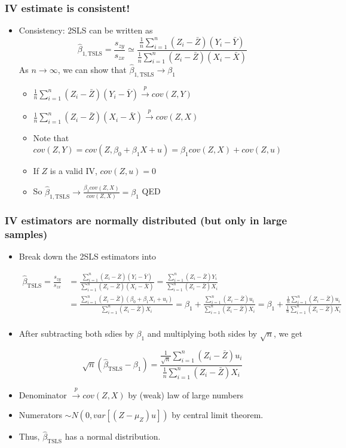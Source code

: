 \documentclass[aspectratio=169]{beamer}
\begin{document}
\begin{frame}
\frametitle{IV estimate is consistent!}
\begin{itemize}
\item Consistency: 2SLS can be written as
\[
\hat{\beta}_{1,\text{TSLS}}=\frac{s_{zy}}{s_{zx}}\simeq\frac{\frac{1}{n}\sum_{i=1}^n(Z_i-\bar{Z})(Y_i-\bar{Y})}{\frac{1}{n}\sum_{i=1}^n(Z_i-\bar{Z})(X_i-\bar{X})}
\]
As $n\to\infty$, we can show that $\hat{\beta}_{1,\text{TSLS}}\to\beta_1$
\begin{itemize}
\item $\frac{1}{n}\sum_{i=1}^n(Z_i-\bar{Z})(Y_i-\bar{Y}) \xrightarrow{p} cov(Z,Y)$
\item $\frac{1}{n}\sum_{i=1}^n(Z_i-\bar{Z})(X_i-\bar{X}) \xrightarrow{p} cov(Z,X)$
\item Note that $cov(Z,Y) = cov(Z,\beta_0+\beta_1X+u)=\beta_1 cov(Z,X) + cov(Z,u)$
\item If $Z$ is a valid IV, $ cov(Z,u)=0$
\item So $\hat{\beta}_{1,\text{TSLS}}\to\frac{\beta_1 cov(Z,X)}{cov(Z,X)} =\beta_1$ QED
\end{itemize}
\end{itemize}
\end{frame}

\begin{frame}
\frametitle{IV estimators are normally distributed (but only in large samples)}
\begin{itemize}
\item Break down the 2SLS estimators into
\begin{scriptsize}
\[
\begin{aligned}
\hat{\beta}_{\text{TSLS}}=\frac{s_{zy}}{s_{zx}}&=\frac{\sum_{i=1}^n(Z_i-\bar{Z})(Y_i-\bar{Y})}{\sum_{i=1}^n(Z_i-\bar{Z})(X_i-\bar{X})}= \frac{\sum_{i=1}^n(Z_i-\bar{Z})Y_i}{\sum_{i=1}^n(Z_i-\bar{Z})X_i}\\
\
&= \frac{\sum_{i=1}^n(Z_i-\bar{Z})(\beta_0+\beta_1X_i + u_i) }{\sum_{i=1}^n(Z_i-\bar{Z})X_i}= \beta_1+\frac{\sum_{i=1}^n(Z_i-\bar{Z})u_i}{\sum_{i=1}^n(Z_i-\bar{Z})X_i}=\beta_1+\frac{\frac{1}{n}\sum_{i=1}^n(Z_i-\bar{Z})u_i}{\frac{1}{n}\sum_{i=1}^n(Z_i-\bar{Z})X_i}\\
\end{aligned}
\]
\end{scriptsize}
\item After subtracting both sdies by $\beta_1$ and multiplying both sides by $\sqrt{n}$, we get
\begin{scriptsize}
\[
\sqrt{n}(\hat{\beta}_{\text{TSLS}}-\beta_1)=\frac{\frac{1}{\sqrt{n}}\sum_{i=1}^n(Z_i-\bar{Z})u_i}{\frac{1}{n}\sum_{i=1}^n(Z_i-\bar{Z})X_i}
\]
\end{scriptsize}
\item Denominator $\xrightarrow{p} cov(Z,X)$ by (weak) law of large numbers
\item Numerators $\sim N(0, var[(Z-\mu_Z)u])$ by central limit theorem. 
\item Thus, $\hat{\beta}_{\text{TSLS}}$ has a normal distribution.
\end{itemize}
\end{frame}
\end{document}
